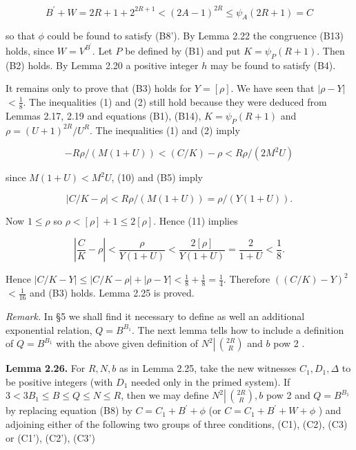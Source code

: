 \documentclass[11pt,a4paper]{article}
\newcommand{\origpage}[1]{\marginnote{\footnotesize\textbf{[#1]}}}
\begin{document}
\[
B^{\prime}+W=2 R+1+2^{2 R+1}<(2 A-1)^{2 R} \leq \psi_{A}(2 R+1)=C
\]

so that $\phi$ could be found to satisfy (B8'). By Lemma 2.22 the congruence (B13) holds, since $W=V^{B^{\prime}}$. Let $P$ be defined by (B1) and put $K=\psi_{P}(R+1)$. Then (B2) holds. By Lemma 2.20 a positive integer $h$ may be found to satisfy (B4).

It remains only to prove that (B3) holds for $Y=[\rho]$. We have seen that $|\rho-Y|$ $<\frac{1}{8}$. The inequalities (1) and (2) still hold because they were deduced from Lemmas 2.17, 2.19 and equations (B1), (B14), $K=\psi_{P}(R+1)$ and $\rho=(U+1)^{2 R} / U^{R}$. The inequalities (1) and (2) imply


\begin{equation*}
-R \rho /(M(1+U))<(C / K)-\rho<R\rho/(2M^{2}U) \tag{10}
\end{equation*}


since $M(1+U)<M^{2} U$, (10) and (B5) imply


\begin{equation*}
|C / K-\rho|<R \rho /(M(1+U))=\rho /(Y(1+U)) . \tag{11}
\end{equation*}


Now $1 \leq \rho$ so $\rho<[\rho]+1 \leq 2[\rho]$. Hence (11) implies


\begin{equation*}
\left|\frac{C}{K}-\rho\right|<\frac{\rho}{Y(1+U)}<\frac{2[\rho]}{Y(1+U)}=\frac{2}{1+U}<\frac{1}{8} . \tag{12}
\end{equation*}


Hence $|C / K-Y| \leq|C / K-\rho|+|\rho-Y|<\frac{1}{8}+\frac{1}{8}=\frac{1}{4}$. Therefore $((C / K)-Y)^{2}$ $<\frac{1}{16}$ and (B3) holds. Lemma 2.25 is proved.

\noindent\emph{Remark.} In §5 we shall find it necessary to define as well an additional exponential relation, $Q=B^{B_{1}}$. The next lemma tells how to include a definition of $Q=B^{B_{1}}$ with the above given definition of $N^{2} \left\lvert\,\allowbreak \binom{2R}{R}\right.$ and $b$ pow 2 .

\noindent\textbf{Lemma 2.26.}\origpage{559} For $R,\allowbreak N,\allowbreak b$ as in Lemma 2.25, take the new witnesses $C_1,\allowbreak D_1,\allowbreak \Delta$ to be positive integers (with $D_1$ needed only in the primed system). If $3<3 B_{1} \leq B \leq Q \leq N \leq R$, then we may define $N^{2} \left\lvert\,\allowbreak \binom{ 2 R}{R}\right.,\allowbreak  b$ pow 2 and $Q=B^{B_{1}}$ by replacing equation (B8) by $C=C_{1}+B^{\prime}+\phi$ (or $C=C_{1}+B^{\prime}+W+\phi$ ) and adjoining either of the following two groups of three conditions, (C1), (C2), (C3) or (C1'), (C2'), (C3')
\end{document}

